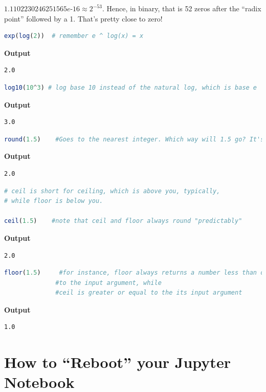 \begin{rem}
$1.1102230246251565e$-$16 \approx 2 ^{-53}$. Hence, in binary, that is 52 zeros after the ``radix point'' followed by a 1. That's pretty close to zero!
\end{rem}

\begin{lstlisting}[language=Julia,style=mystyle]
exp(log(2))  # remember e ^ log(x) = x
\end{lstlisting}
\textbf{Output} 
\begin{verbatim}
2.0
\end{verbatim}

\begin{lstlisting}[language=Julia,style=mystyle]
log10(10^3) # log base 10 instead of the natural log, which is base e
\end{lstlisting}
\textbf{Output} 
\begin{verbatim}
3.0
\end{verbatim}
\begin{lstlisting}[language=Julia,style=mystyle]
round(1.5)    #Goes to the nearest integer. Which way will 1.5 go? It's quite arbitrary.
\end{lstlisting}
\textbf{Output} 
\begin{verbatim}
2.0
\end{verbatim}

\begin{lstlisting}[language=Julia,style=mystyle]
# ceil is short for ceiling, which is above you, typically,
# while floor is below you.

ceil(1.5)    #note that ceil and floor always round "predictably"
\end{lstlisting}
\textbf{Output} 
\begin{verbatim}
2.0
\end{verbatim}

\begin{lstlisting}[language=Julia,style=mystyle]
floor(1.5)     #for instance, floor always returns a number less than or equal 
              #to the input argument, while
              #ceil is greater or equal to the its input argument
\end{lstlisting}
\textbf{Output} 
\begin{verbatim}
1.0
\end{verbatim}


\section{How to ``Reboot'' your Jupyter Notebook}


